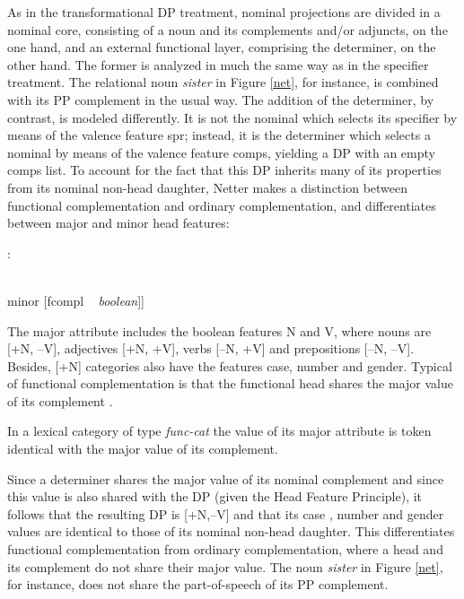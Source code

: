 \documentclass[output=paper]{langsci/langscibook}
\begin{document}
As in the transformational DP treatment, nominal projections are divided in a nominal core, 
consisting of a noun and its complements and/or adjuncts, on the one hand, and an external 
functional layer, comprising the determiner, on the other hand. The former is analyzed in much the 
same way as in the specifier treatment. The relational noun   
{\it sister\/} in Figure \ref{net}, for instance, is combined with 
its PP complement in the usual way. The addition of the determiner, by contrast, is 
modeled differently. It is not the nominal which selects its specifier by means of the valence 
feature {\sc spr}; instead, it is the determiner which selects a nominal by means of 
the valence feature {\sc comps}, yielding a DP with an empty {\sc comps} list. 
To account for the fact that this DP inherits many of its properties from its nominal 
non-head daughter, Netter makes a distinction between functional 
complementation and ordinary complementation, and differentiates between major and minor 
{\sc head} features: 

\begin{exe} 
 : \begin{avm}
                              [major [n ~ {\it boolean\/} \\
                                      v ~ {\it boolean\/} ] \\
                               minor [fcompl ~ {\it boolean\/}]]
                              \end{avm} 
\end{exe} 

\noindent
The {\sc major} attribute includes the boolean features N and V, where 
nouns are [+N, --V], adjectives [+N, +V], verbs [--N, +V] and prepositions [--N, --V]. 
Besides, [+N] categories also have the features {\sc case}, {\sc number} and {\sc gender}. 
Typical of functional complementation is that the functional head shares the 
{\sc major} value of its complement \citep[311--312]{Netter94}. 

\begin{exe} 
\ex\label{maj} In a lexical category of type {\it func-cat\/} the value of its {\sc major} 
      attribute is token identical with the {\sc major} value of its complement. 
\end{exe} 

\noindent
Since a determiner shares the {\sc major} value of its nominal complement and since this value is 
also shared with the DP (given the Head Feature Principle), it follows that the resulting 
DP is [+N,--V] and that its {\sc case} , {\sc number} and {\sc gender} values are 
identical to those of its nominal non-head daughter. 
This differentiates functional complementation from ordinary complementation, where 
a head and its complement do not share their {\sc major} value. The noun {\it sister\/} 
in Figure \ref{net}, for instance, does not share the part-of-speech of its PP complement. 
\end{document}
